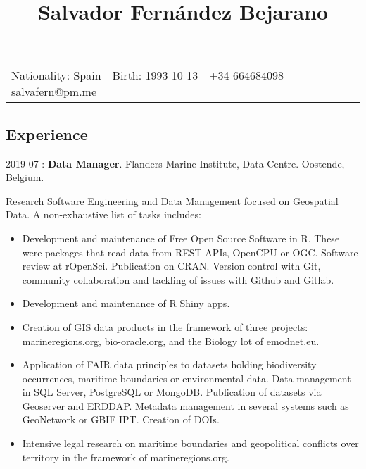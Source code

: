 \documentclass[
  16,
]{article}
\title{Salvador Fernández Bejarano}
\author{}
\date{}
\begin{document}
\maketitle
\ifdefined\Shaded\renewenvironment{Shaded}{\begin{tcolorbox}[sharp corners, interior hidden, breakable, borderline west={3pt}{0pt}{shadecolor}, enhanced, boxrule=0pt, frame hidden]}{\end{tcolorbox}}\fi

\begin{longtable}[]{@{}
  >{\raggedright\arraybackslash}p{}@{}}
\toprule\noalign{}
\endhead
\bottomrule\noalign{}
\endlastfoot
Nationality: Spain - Birth: 1993-10-13 - +34 664684098 -
salvafern@pm.me \\
\end{longtable}

\hypertarget{experience}{%
\subsection{Experience}\label{experience}}

2019-07 : \textbf{Data Manager}. Flanders Marine Institute, Data Centre.
Oostende, Belgium.

Research Software Engineering and Data Management focused on Geospatial
Data. A non-exhaustive list of tasks includes:

\begin{itemize}
\item
  Development and maintenance of Free Open Source Software in R. These
  were packages that read data from REST APIs, OpenCPU or OGC. Software
  review at rOpenSci. Publication on CRAN. Version control with Git,
  community collaboration and tackling of issues with Github and Gitlab.
\item
  Development and maintenance of R Shiny apps.
\item
  Creation of GIS data products in the framework of three projects:
  marineregions.org, bio-oracle.org, and the Biology lot of emodnet.eu.
\item
  Application of FAIR data principles to datasets holding biodiversity
  occurrences, maritime boundaries or environmental data. Data
  management in SQL Server, PostgreSQL or MongoDB. Publication of
  datasets via Geoserver and ERDDAP. Metadata management in several
  systems such as GeoNetwork or GBIF IPT. Creation of DOIs.
\item
  Intensive legal research on maritime boundaries and geopolitical
  conflicts over territory in the framework of marineregions.org.
\end{itemize}
\end{document}
